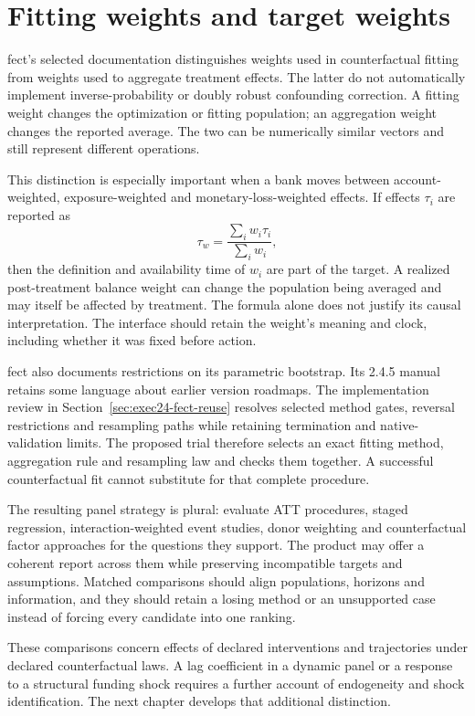 

\section{Fitting weights and target weights}

fect's selected documentation distinguishes weights used in counterfactual
fitting from weights used to aggregate treatment effects. The latter do not
automatically implement inverse-probability or doubly robust confounding
correction. A fitting weight changes the optimization or fitting population;
an aggregation weight changes the reported average. The two can be numerically
similar vectors and still represent different operations. \cite{v12_sw_fect}

This distinction is especially important when a bank moves between
account-weighted, exposure-weighted and monetary-loss-weighted effects.
If effects \(\tau_i\) are reported as
\[
 \tau_w=\frac{\sum_i w_i\tau_i}{\sum_i w_i},
\]
then the definition and availability time of \(w_i\) are part of the target.
A realized post-treatment balance weight can change the population being
averaged and may itself be affected by treatment. The formula alone does not
justify its causal interpretation. The interface should retain the weight's
meaning and clock, including whether it was fixed before action.

fect also documents restrictions on its parametric bootstrap. Its 2.4.5
manual retains some language about earlier version roadmaps. The implementation
review in Section~\ref{sec:exec24-fect-reuse} resolves selected method gates,
reversal restrictions and resampling paths while retaining termination and
native-validation limits. The proposed trial therefore selects an exact fitting
method, aggregation rule and resampling law and checks them together. A
successful counterfactual fit cannot substitute for that complete procedure.

The resulting panel strategy is plural: evaluate ATT procedures, staged
regression, interaction-weighted event studies, donor weighting and
counterfactual factor approaches for the questions they support. The product
may offer a coherent report across them while preserving incompatible targets
and assumptions. Matched comparisons should align populations, horizons and
information, and they should retain a losing method or an unsupported case
instead of forcing every candidate into one ranking.

These comparisons concern effects of declared interventions and trajectories
under declared counterfactual laws. A lag coefficient in a dynamic panel or
a response to a structural funding shock requires a further account of
endogeneity and shock identification. The next chapter develops that
additional distinction.


